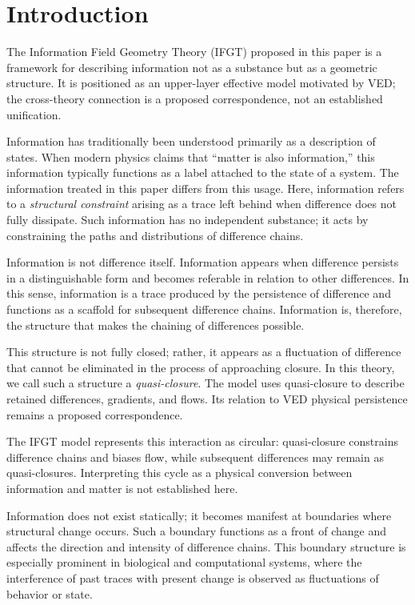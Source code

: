 \section{Introduction}
\label{sec:introduction}

The Information Field Geometry Theory (IFGT) proposed in this paper is a
framework for describing information not as a substance but as a geometric
structure. It is positioned as an upper-layer effective model motivated by
VED; the cross-theory connection is a proposed correspondence, not an
established unification.

Information has traditionally been understood primarily as a description of states. When modern physics claims that ``matter is also information,'' this information typically functions as a label attached to the state of a system. The information treated in this paper differs from this usage. Here, information refers to a \emph{structural constraint} arising as a trace left behind when difference does not fully dissipate. Such information has no independent substance; it acts by constraining the paths and distributions of difference chains.

Information is not difference itself. Information appears when difference persists in a distinguishable form and becomes referable in relation to other differences. In this sense, information is a trace produced by the persistence of difference and functions as a scaffold for subsequent difference chains. Information is, therefore, the structure that makes the chaining of differences possible.

This structure is not fully closed; rather, it appears as a fluctuation of
difference that cannot be eliminated in the process of approaching closure.
In this theory, we call such a structure a \emph{quasi-closure}.  The model
uses quasi-closure to describe retained differences, gradients, and flows. Its
relation to VED physical persistence remains a proposed correspondence.

The IFGT model represents this interaction as circular: quasi-closure
constrains difference chains and biases flow, while subsequent differences may
remain as quasi-closures. Interpreting this cycle as a physical conversion
between information and matter is not established here.

Information does not exist statically; it becomes manifest at boundaries where structural change occurs. Such a boundary functions as a front of change and affects the direction and intensity of difference chains. This boundary structure is especially prominent in biological and computational systems, where the interference of past traces with present change is observed as fluctuations of behavior or state.

